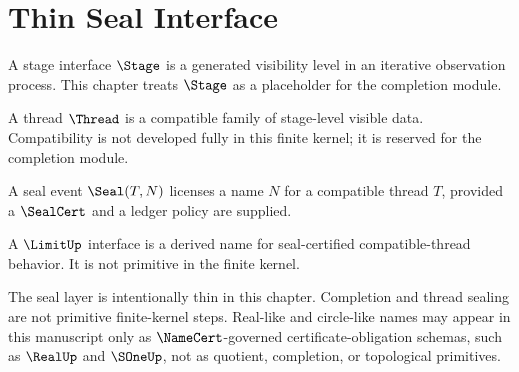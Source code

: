 \chapter{Thin Seal Interface}
\label{ch:core-thin-seal-interface}

\begin{definition}
A stage interface \(\Stage\) is a generated visibility level in an iterative observation process. This chapter treats \(\Stage\) as a placeholder for the completion module.
\end{definition}

\begin{definition}[Thread]
\label{def:thread}
A thread \(\Thread\) is a compatible family of stage-level visible data. Compatibility is not developed fully in this finite kernel; it is reserved for the completion module.
\end{definition}

\begin{definition}
\label{def:seal-interface}
\label{def:thin-seal-interface}
A seal event \(\Seal(T,N)\) licenses a name \(N\) for a compatible thread \(T\), provided a \(\SealCert\) and a ledger policy are supplied.
\end{definition}

\begin{corollary}
\label{cor:limit-like-interfaces-are-derived}
A \(\LimitUp\) interface is a derived name for seal-certified compatible-thread behavior. It is not primitive in the finite kernel.
\end{corollary}

\begin{remark}
The seal layer is intentionally thin in this chapter. Completion and thread sealing are not primitive finite-kernel steps. Real-like and circle-like names may appear in this manuscript only as $\NameCert$-governed certificate-obligation schemas, such as $\RealUp$ and $\SOneUp$, not as quotient, completion, or topological primitives.
\end{remark}
